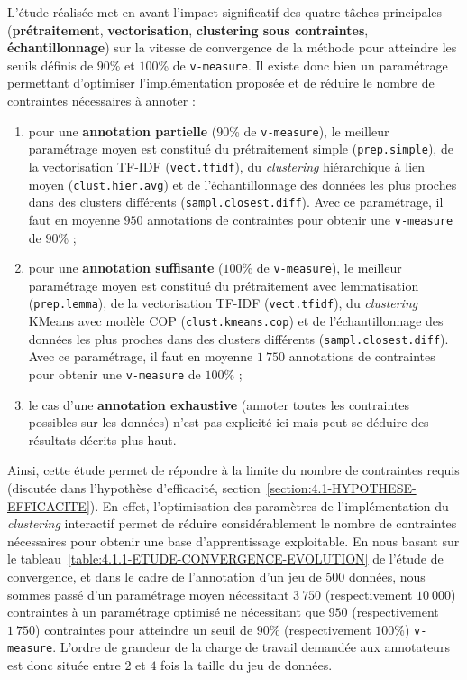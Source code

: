 			L'étude réalisée met en avant l'impact significatif des quatre tâches principales (\textbf{prétraitement}, \textbf{vectorisation}, \textbf{clustering sous contraintes}, \textbf{échantillonnage}) sur la vitesse de convergence de la méthode pour atteindre les seuils définis de $90$\% et $100$\% de \texttt{v-measure}. Il existe donc bien un paramétrage permettant d'optimiser l'implémentation proposée et de réduire le nombre de contraintes nécessaires à annoter :
			\begin{enumerate}
				\item pour une \textbf{annotation partielle} ($90$\% de \texttt{v-measure}), le meilleur paramétrage moyen est constitué du prétraitement simple (\texttt{prep.simple}), de la vectorisation TF-IDF (\texttt{vect.tfidf}), du \textit{clustering} hiérarchique à lien moyen (\texttt{clust.hier.avg}) et de l'échantillonnage des données les plus proches dans des clusters différents (\texttt{sampl.closest.diff}). Avec ce paramétrage, il faut en moyenne $950$ annotations de contraintes pour obtenir une \texttt{v-measure} de $90$\% ;
				\item pour une \textbf{annotation suffisante} ($100$\% de \texttt{v-measure}), le meilleur paramétrage moyen est constitué du prétraitement avec lemmatisation (\texttt{prep.lemma}), de la vectorisation TF-IDF (\texttt{vect.tfidf}), du \textit{clustering} KMeans avec modèle COP (\texttt{clust.kmeans.cop}) et de l'échantillonnage des données les plus proches dans des clusters différents (\texttt{sampl.closest.diff}). Avec ce paramétrage, il faut en moyenne $1~750$ annotations de contraintes pour obtenir une \texttt{v-measure} de $100$\% ;
				\item le cas d'une \textbf{annotation exhaustive} (annoter toutes les contraintes possibles sur les données) n'est pas explicité ici mais peut se déduire des résultats décrits plus haut.
			\end{enumerate}

			Ainsi, cette étude permet de répondre à la limite du nombre de contraintes requis (discutée dans l'hypothèse d'efficacité, section~\ref{section:4.1-HYPOTHESE-EFFICACITE}).
			En effet, l'optimisation des paramètres de l'implémentation du \textit{clustering} interactif permet de réduire considérablement le nombre de contraintes nécessaires pour obtenir une base d'apprentissage exploitable.
			En nous basant sur le tableau~\ref{table:4.1.1-ETUDE-CONVERGENCE-EVOLUTION} de l'étude de convergence, et dans le cadre de l'annotation d'un jeu de $500$ données, nous sommes passé d'un paramétrage moyen nécessitant $3~750$ (respectivement $10~000$) contraintes à un paramétrage optimisé ne nécessitant que $950$ (respectivement $1~750$) contraintes pour atteindre un seuil de $90$\% (respectivement $100$\%) \texttt{v-measure}.
			L'ordre de grandeur de la charge de travail demandée aux annotateurs est donc située entre $2$ et $4$ fois la taille du jeu de données.
			

